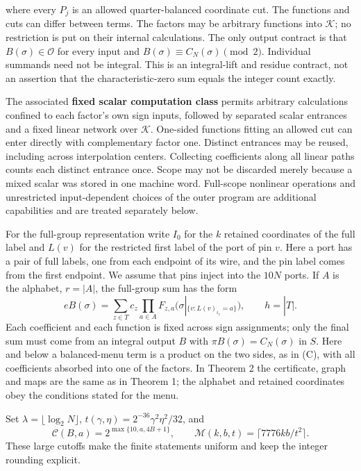 \documentclass[
  11pt,
]{article}
\newcommand{\floor}[1]{\lfloor #1\rfloor}
\newcommand{\ceil}[1]{\lceil #1\rceil}
\begin{document}
where every \(P_j\) is an allowed quarter-balanced coordinate cut. The
functions and cuts can differ between terms. The factors may be
arbitrary functions into \(\mathcal K\); no restriction is put on their
internal calculations. The only output contract is that
\(B(\sigma)\in\mathcal O\) for every input and
\(B(\sigma)\equiv C_N(\sigma)\pmod2\). Individual summands need not be
integral. This is an integral-lift and residue contract, not an
assertion that the characteristic-zero sum equals the integer count
exactly.

The associated \textbf{fixed scalar computation class} permits arbitrary
calculations confined to each factor's own sign inputs, followed by
separated scalar entrances and a fixed linear network over
\(\mathcal K\). One-sided functions fitting an allowed cut can enter
directly with complementary factor one. Distinct entrances may be
reused, including across interpolation centers. Collecting coefficients
along all linear paths counts each distinct entrance once. Scope may not
be discarded merely because a mixed scalar was stored in one machine
word. Full-scope nonlinear operations and unrestricted input-dependent
choices of the outer program are additional capabilities and are treated
separately below.

For the full-group representation write \(I_0\) for the \(k\) retained
coordinates of the full label and \(L(v)\) for the restricted first label
of the port of pin \(v\). Here a port has a pair of full labels, one from each endpoint of its wire, and the pin label comes from the first endpoint. We assume that pins inject into the \(10N\)
ports. If \(A\) is the alphabet, \(r=|A|\), the full-group sum has the form
\[
 eB(\sigma)=\sum_{z\in T}c_z\prod_{a\in A}
 F_{z,a}\bigl(\sigma|_{\{v:L(v)_{i_z}=a\}}\bigr),\qquad h=|T|.
 \tag{D}
\]
Each coefficient and each function is fixed across sign assignments;
only the final sum must come from an integral output \(B\) with
\(\pi B(\sigma)=C_N(\sigma)\) in \(S\). Here and below a balanced-menu
term is a product on the two sides, as in (C), with all coefficients
absorbed into one of the factors. In Theorem 2 the certificate, graph
and maps are the same as in Theorem 1; the alphabet and retained
coordinates obey the conditions stated for the menu.



Set \(\lambda=\floor{\log_2 N}\),
\(t(\gamma,\eta)=2^{-36}\gamma^2\eta^2/32\), and
\[
 \mathcal C(B,a)=2^{\max\{10,a,4B+1\}},\qquad
 \mathcal M(k,b,t)=\ceil{7776kb/t^2}.
\]
These large cutoffs make the finite statements uniform and keep the
integer rounding explicit.
\end{document}
